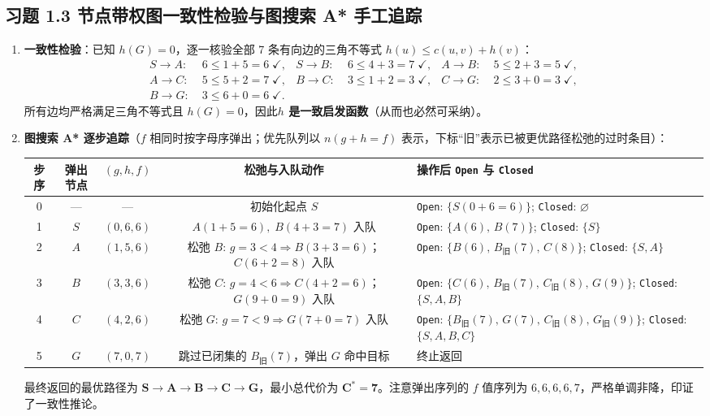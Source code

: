 \subsection*{习题 1.3 节点带权图一致性检验与图搜索 A* 手工追踪}
\begin{enumerate}[label=(\arabic*), leftmargin=1.8em]
  \item \textbf{一致性检验}：已知 $h(G)=0$，逐一核验全部 7 条有向边的三角不等式 $h(u) \le c(u,v) + h(v)$：
  \begin{align*}
    S\to A:\;& 6 \le 1 + 5 = 6\;\checkmark, &
    S\to B:\;& 6 \le 4 + 3 = 7\;\checkmark, &
    A\to B:\;& 5 \le 2 + 3 = 5\;\checkmark, \\
    A\to C:\;& 5 \le 5 + 2 = 7\;\checkmark, &
    B\to C:\;& 3 \le 1 + 2 = 3\;\checkmark, &
    C\to G:\;& 2 \le 3 + 0 = 3\;\checkmark, \\
    B\to G:\;& 3 \le 6 + 0 = 6\;\checkmark.
  \end{align*}
  所有边均严格满足三角不等式且 $h(G)=0$，因此\textbf{$h$ 是一致启发函数}（从而也必然可采纳）。
  \item \textbf{图搜索 A* 逐步追踪}（$f$ 相同时按字母序弹出；优先队列以 $n(g{+}h{=}f)$ 表示，下标“旧”表示已被更优路径松弛的过时条目）：

  \begin{center}
  \footnotesize
  \begin{tabularx}{\linewidth}{@{}c c c c X@{}}
  \toprule
  \textbf{步序} & \textbf{弹出节点} & $(g, h, f)$ & \textbf{松弛与入队动作} & \textbf{操作后 \texttt{Open} 与 \texttt{Closed}} \\
  \midrule
  0 & --- & --- & 初始化起点 $S$ & \texttt{Open}: $\{S(0{+}6{=}6)\}$;\; \texttt{Closed}: $\varnothing$ \\
  1 & $S$ & $(0,6,6)$ & $A(1{+}5{=}6),\; B(4{+}3{=}7)$ 入队 & \texttt{Open}: $\{A(6),\, B(7)\}$;\; \texttt{Closed}: $\{S\}$ \\
  2 & $A$ & $(1,5,6)$ & 松弛 $B$: $g=3<4\Rightarrow B(3{+}3{=}6)$；$C(6{+}2{=}8)$ 入队 & \texttt{Open}: $\{B(6),\, B_{\text{旧}}(7),\, C(8)\}$;\; \texttt{Closed}: $\{S,A\}$ \\
  3 & $B$ & $(3,3,6)$ & 松弛 $C$: $g=4<6\Rightarrow C(4{+}2{=}6)$；$G(9{+}0{=}9)$ 入队 & \texttt{Open}: $\{C(6),\, B_{\text{旧}}(7),\, C_{\text{旧}}(8),\, G(9)\}$;\; \texttt{Closed}: $\{S,A,B\}$ \\
  4 & $C$ & $(4,2,6)$ & 松弛 $G$: $g=7<9\Rightarrow G(7{+}0{=}7)$ 入队 & \texttt{Open}: $\{B_{\text{旧}}(7),\, G(7),\, C_{\text{旧}}(8),\, G_{\text{旧}}(9)\}$;\; \texttt{Closed}: $\{S,A,B,C\}$ \\
  5 & $G$ & $(7,0,7)$ & 跳过已闭集的 $B_{\text{旧}}(7)$，弹出 $G$ 命中目标 & 终止返回 \\
  \bottomrule
  \end{tabularx}
  \end{center}
  最终返回的最优路径为 $\mathbf{S \to A \to B \to C \to G}$，最小总代价为 $\mathbf{C^* = 7}$。注意弹出序列的 $f$ 值序列为 $6, 6, 6, 6, 7$，严格单调非降，印证了一致性推论。
\end{enumerate}

